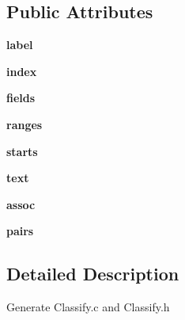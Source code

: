 \subsection*{Public Attributes}
\begin{DoxyCompactItemize}
\item 
\hypertarget{classc_1_1_classify_1_1_classify_a39504bd936bf5576befb10e0ac43d83f}{}{\bfseries label}\label{classc_1_1_classify_1_1_classify_a39504bd936bf5576befb10e0ac43d83f}

\item 
\hypertarget{classc_1_1_classify_1_1_classify_a4f7fa627ce6c996d15b94b95fc308efd}{}{\bfseries index}\label{classc_1_1_classify_1_1_classify_a4f7fa627ce6c996d15b94b95fc308efd}

\item 
\hypertarget{classc_1_1_classify_1_1_classify_ae16c6fab346508b48b720cd04e9ce7df}{}{\bfseries fields}\label{classc_1_1_classify_1_1_classify_ae16c6fab346508b48b720cd04e9ce7df}

\item 
\hypertarget{classc_1_1_classify_1_1_classify_a1e4a9a02e19f108821677534f7e8d60a}{}{\bfseries ranges}\label{classc_1_1_classify_1_1_classify_a1e4a9a02e19f108821677534f7e8d60a}

\item 
\hypertarget{classc_1_1_classify_1_1_classify_afdb329410c16ea92a7ac17476f576fde}{}{\bfseries starts}\label{classc_1_1_classify_1_1_classify_afdb329410c16ea92a7ac17476f576fde}

\item 
\hypertarget{classc_1_1_classify_1_1_classify_a301a21d13817bbbbf07d6af1226c244a}{}{\bfseries text}\label{classc_1_1_classify_1_1_classify_a301a21d13817bbbbf07d6af1226c244a}

\item 
\hypertarget{classc_1_1_classify_1_1_classify_ab4f473fa1589075793de2f93ebe9bfa6}{}{\bfseries assoc}\label{classc_1_1_classify_1_1_classify_ab4f473fa1589075793de2f93ebe9bfa6}

\item 
\hypertarget{classc_1_1_classify_1_1_classify_ac670ebd238054400347771255ad5d043}{}{\bfseries pairs}\label{classc_1_1_classify_1_1_classify_ac670ebd238054400347771255ad5d043}

\end{DoxyCompactItemize}


\subsection{Detailed Description}
\begin{DoxyVerb}Generate Classify.c and Classify.h\end{DoxyVerb}
 

